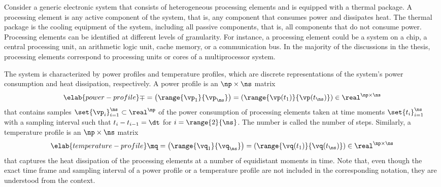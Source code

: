 Consider a generic electronic system that consists of \np heterogeneous
processing elements and is equipped with a thermal package. A processing element
is any active component of the system, that is, any component that consumes
power and dissipates heat. The thermal package is the cooling equipment of the
system, including all passive components, that is, all components that do not
consume power. Processing elements can be identified at different levels of
granularity. For instance, a processing element could be a system on a chip,
a central processing unit, an arithmetic logic unit, cache memory, or a
communication bus. In the majority of the discussions in the thesis, processing
elements correspond to processing units or cores of a multiprocessor system.

The system is characterized by power profiles and temperature profiles, which
are discrete representations of the system's power consumption and heat
dissipation, respectively. A power profile is an $\np \times \ns$ matrix
\begin{equation} \elab{power-profile}
  \mp
  = \left(\range{\vp_1}{\vp_\ns}\right)
  = \left(\range{\vp(t_1)}{\vp(t_\ns)}\right) \in \real^{\np \times \ns}
\end{equation}
that contains \ns samples $\set{\vp_i}_{i = 1}^\ns \subset \real^\np$ of the
power consumption of \np processing elements taken at \ns time moments
$\set{t_i}_{i = 1}^\ns$ with a sampling interval \dt such that $t_i - t_{i - 1}
= \dt$ for $i = \range{2}{\ns}$. The number \ns is called the number of steps.
Similarly, a temperature profile is an $\np \times \ns$ matrix
\begin{equation} \elab{temperature-profile}
  \mq
  = \left(\range{\vq_1}{\vq_\ns}\right)
  = \left(\range{\vq(t_1)}{\vq(t_\ns)}\right) \in \real^{\np \times \ns}
\end{equation}
that captures the heat dissipation of the processing elements at a number of
equidistant moments in time. Note that, even though the exact time frame and
sampling interval of a power profile or a temperature profile are not included
in the corresponding notation, they are understood from the context.
